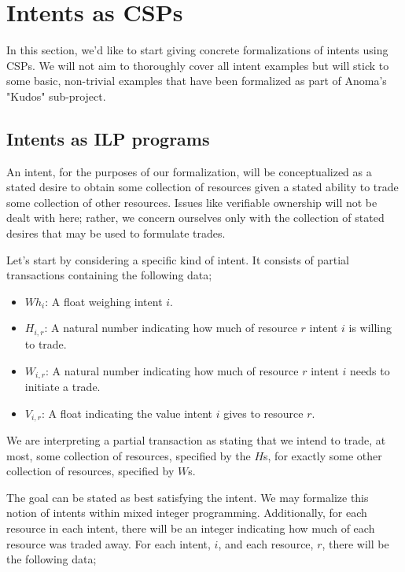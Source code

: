 \section{Intents as CSPs}\label{sec:csp-intents}

In this section, we'd like to start giving concrete formalizations of intents using CSPs. We will not aim to thoroughly cover all intent examples but will stick to some basic, non-trivial examples that have been formalized as part of Anoma's "Kudos" sub-project.

\subsection{Intents as ILP programs}\label{sec:ilp-intents}

An intent, for the purposes of our formalization, will be conceptualized as a stated desire to obtain some collection of resources given a stated ability to trade some collection of other resources. Issues like verifiable ownership will not be dealt with here; rather, we concern ourselves only with the collection of stated desires that may be used to formulate trades.

Let's start by considering a specific kind of intent. It consists of partial transactions containing the following data;

\begin{itemize}
    \item $Wh_i$: A float weighing intent $i$.
    \item $H_{i, r}$: A natural number indicating how much of resource $r$ intent $i$ is willing to trade.
    \item $W_{i, r}$: A natural number indicating how much of resource $r$ intent $i$ needs to initiate a trade.
    \item $V_{i, r}$: A float indicating the value intent $i$ gives to resource $r$.
\end{itemize}

We are interpreting a partial transaction as stating that we intend to trade, at most, some collection of resources, specified by the $H$s, for exactly some other collection of resources, specified by $W$s.

The goal can be stated as best satisfying the intent. We may formalize this notion of intents within mixed integer programming. Additionally, for each resource in each intent, there will be an integer indicating how much of each resource was traded away. For each intent, $i$, and each resource, $r$, there will be the following data;

